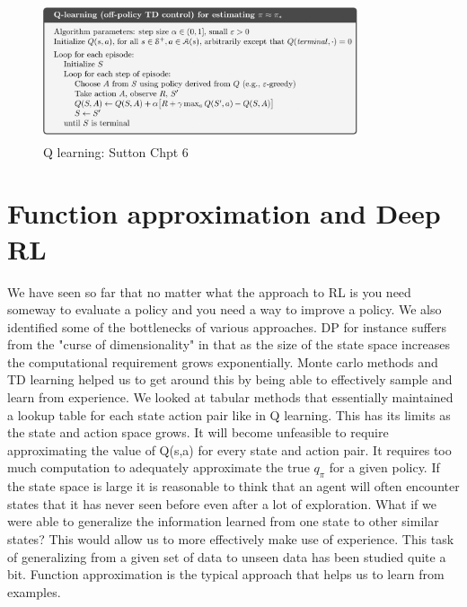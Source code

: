 \begin{figure}[H]
        \centering
        \includegraphics[width=350px,height=150px]{images/q_learning.png}
        \caption{Q learning: Sutton Chpt 6}
        \label{fig:my_label}
    \end{figure}
    
    
\section{Function approximation and Deep RL}

We have seen so far that no matter what the approach to RL is you need someway to evaluate a policy and you need a way to improve a policy. We also identified some of the bottlenecks of various approaches. DP for instance suffers from the "curse of dimensionality" in that as the size of the state space increases the computational requirement grows exponentially. Monte carlo methods and TD learning helped us to get around this by being able to effectively sample and learn from experience. We looked at tabular methods that essentially maintained a lookup table for each state action pair like in Q learning. This has its limits as the state and action space grows. It will become unfeasible to require approximating the value of Q(s,a) for every state and action pair. It requires too much computation to adequately approximate the true $q_{\pi}$ for a given policy. If the state space is large it is reasonable to think that an agent will often encounter states that it has never seen before even after a lot of exploration. What if we were able to generalize the information learned from one state to other similar states? This would allow us to more effectively make use of experience. This task of generalizing from a given set of data to unseen data has been studied quite a bit. Function approximation is the typical approach that helps us to learn from examples. 

